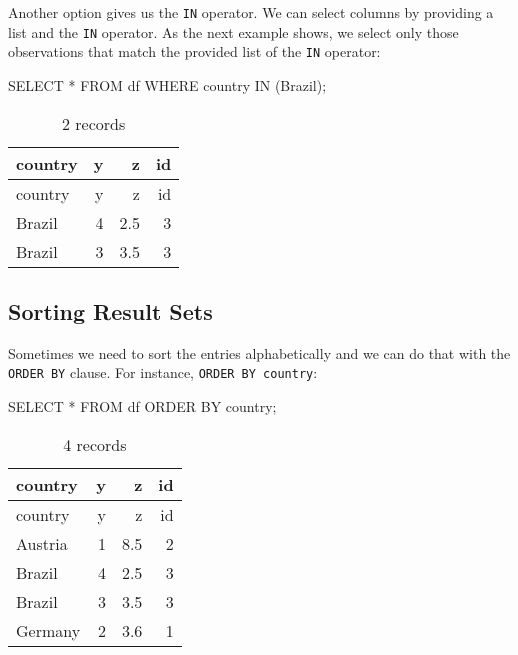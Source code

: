 \documentclass[
  letterpaper,
  DIV=11,
  numbers=noendperiod]{scrreprt}
\newenvironment{Shaded}{\begin{snugshade}}{\end{snugshade}}
\newcommand{\KeywordTok}[1]{\textcolor[rgb]{0.00,0.23,0.31}{#1}}
\newcommand{\NormalTok}[1]{\textcolor[rgb]{0.00,0.23,0.31}{#1}}
\newcommand{\OperatorTok}[1]{\textcolor[rgb]{0.37,0.37,0.37}{#1}}
\newcommand{\StringTok}[1]{\textcolor[rgb]{0.13,0.47,0.30}{#1}}
\begin{document}
Another option gives us the \texttt{IN} operator. We can select columns
by providing a list and the \texttt{IN} operator. As the next example
shows, we select only those observations that match the provided list of
the \texttt{IN} operator:

\begin{Shaded}
\begin{Highlighting}[]
\KeywordTok{SELECT} \OperatorTok{*} \KeywordTok{FROM}\NormalTok{ df }\KeywordTok{WHERE}\NormalTok{ country }\KeywordTok{IN}\NormalTok{ (}\StringTok{\textquotesingle{}Brazil\textquotesingle{}}\NormalTok{);}
\end{Highlighting}
\end{Shaded}

\begin{longtable}[]{@{}lrrr@{}}
\caption{2 records}\tabularnewline
\toprule()
country & y & z & id \\
\midrule()
\endfirsthead
\toprule()
country & y & z & id \\
\midrule()
\endhead
Brazil & 4 & 2.5 & 3 \\
Brazil & 3 & 3.5 & 3 \\
\bottomrule()
\end{longtable}

\hypertarget{sorting-result-sets}{%
\subsection{Sorting Result Sets}\label{sorting-result-sets}}

Sometimes we need to sort the entries alphabetically and we can do that
with the \texttt{ORDER\ BY} clause. For instance,
\texttt{ORDER\ BY\ country}:

\begin{Shaded}
\begin{Highlighting}[]
\KeywordTok{SELECT} \OperatorTok{*} \KeywordTok{FROM}\NormalTok{ df }\KeywordTok{ORDER} \KeywordTok{BY}\NormalTok{ country;}
\end{Highlighting}
\end{Shaded}

\begin{longtable}[]{@{}lrrr@{}}
\caption{4 records}\tabularnewline
\toprule()
country & y & z & id \\
\midrule()
\endfirsthead
\toprule()
country & y & z & id \\
\midrule()
\endhead
Austria & 1 & 8.5 & 2 \\
Brazil & 4 & 2.5 & 3 \\
Brazil & 3 & 3.5 & 3 \\
Germany & 2 & 3.6 & 1 \\
\bottomrule()
\end{longtable}
\end{document}
